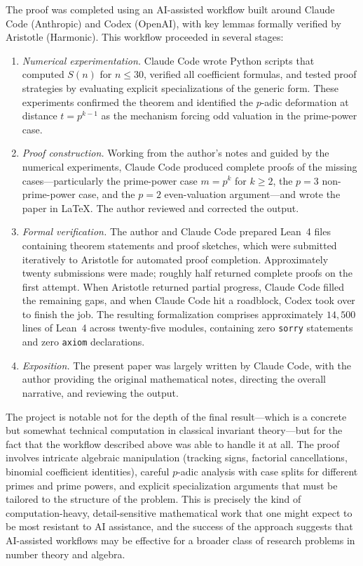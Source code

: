 \documentclass[10pt]{amsart}
\theoremstyle{definition}
\theoremstyle{remark}
\begin{document}
The proof was completed using an AI-assisted workflow built around
Claude Code (Anthropic) and Codex (OpenAI), with key lemmas formally verified by
Aristotle \cite{Aristotle2025} (Harmonic).  This workflow proceeded in several stages:

\begin{enumerate}[label=(\roman*)]
\item \emph{Numerical experimentation.}
Claude Code wrote Python scripts that computed $S(n)$ for $n \le 30$,
verified all coefficient formulas, and tested proof strategies by
evaluating explicit specializations of the generic form.  These
experiments confirmed the theorem and identified the $p$-adic
deformation at distance $t = p^{k-1}$ as the mechanism forcing
odd valuation in the prime-power case.

\item \emph{Proof construction.}
Working from the author's notes and guided by the numerical
experiments, Claude Code produced complete proofs of the
missing cases---particularly the prime-power case $m = p^k$
for $k \ge 2$, the $p = 3$ non-prime-power case, and the
$p = 2$ even-valuation argument---and wrote the paper in
\LaTeX.  The author reviewed and corrected the output.

\item \emph{Formal verification.}
The author and Claude Code prepared Lean~4 files containing
theorem statements and proof sketches, which were submitted
iteratively to Aristotle for automated proof completion.
Approximately twenty submissions were made; roughly half returned
complete proofs on the first attempt.  When Aristotle returned
partial progress, Claude Code filled the remaining gaps, and when Claude Code hit a roadblock, Codex took over to finish the job.  The
resulting formalization comprises approximately
$14{,}500$ lines of Lean~4 across twenty-five modules, containing zero \texttt{sorry} statements and zero
\texttt{axiom} declarations.

\item \emph{Exposition.} The present paper was largely written by
Claude Code, with the author providing the original mathematical
notes, directing the overall narrative, and reviewing the output.
\end{enumerate}

The project is notable not for the depth of the final result---which is a
concrete but somewhat technical computation in classical invariant
theory---but for the fact that the workflow described above was able to
handle it at all.  The proof involves intricate algebraic
manipulation (tracking signs, factorial cancellations, binomial
coefficient identities), careful $p$-adic analysis with case splits
for different primes and prime powers, and explicit specialization
arguments that must be tailored to the structure of the problem.
This is precisely the kind of computation-heavy, detail-sensitive
mathematical work that one might expect to be most resistant to
AI assistance, and the success of the approach suggests that
AI-assisted workflows may be effective for a broader class of
research problems in number theory and algebra.
\end{document}
